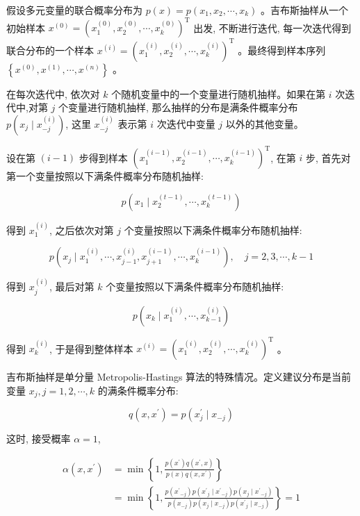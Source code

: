 \documentclass[10pt]{article}
\begin{document}
\begin{CJK*}{UTF8}{bsmi}
假设多元变量的联合概率分布为 $p(x)=p\left(x_{1}, x_{2}, \cdots, x_{k}\right)$ 。吉布斯抽样从一个初始样本 $x^{(0)}=\left(x_{1}^{(0)}, x_{2}^{(0)}, \cdots, x_{k}^{(0)}\right)^{\mathrm{T}}$ 出发, 不断进行迭代, 每一次迭代得到联合分布的一个样本 $x^{(i)}=\left(x_{1}^{(i)}, x_{2}^{(i)}, \cdots, x_{k}^{(i)}\right)^{\mathrm{T}}$ 。最终得到样本序列 $\left\{x^{(0)}, x^{(1)}, \cdots, x^{(n)}\right\}$ 。

在每次迭代中, 依次对 $k$ 个随机变量中的一个变量进行随机抽样。如果在第 $i$ 次迭代中,对第 $j$ 个变量进行随机抽样, 那么抽样的分布是满条件概率分布 $p\left(x_{j} \mid x_{-j}^{(i)}\right)$, 这里 $x_{-j}^{(i)}$ 表示第 $i$ 次迭代中变量 $j$ 以外的其他变量。

设在第 $(i-1)$ 步得到样本 $\left(x_{1}^{(i-1)}, x_{2}^{(i-1)}, \cdots, x_{k}^{(i-1)}\right)^{\mathrm{T}}$, 在第 $i$ 步, 首先对第一个变量按照以下满条件概率分布随机抽样:

$$
p\left(x_{1} \mid x_{2}^{(t-1)}, \cdots, x_{k}^{(t-1)}\right)
$$

得到 $x_{1}^{(i)}$, 之后依次对第 $j$ 个变量按照以下满条件概率分布随机抽样:

$$
p\left(x_{j} \mid x_{1}^{(i)}, \cdots, x_{j-1}^{(i)}, x_{j+1}^{(i-1)}, \cdots, x_{k}^{(i-1)}\right), \quad j=2,3, \cdots, k-1
$$

得到 $x_{j}^{(i)}$, 最后对第 $k$ 个变量按照以下满条件概率分布随机抽样:

$$
p\left(x_{k} \mid x_{1}^{(i)}, \cdots, x_{k-1}^{(i)}\right)
$$

得到 $x_{k}^{(i)}$, 于是得到整体样本 $x^{(i)}=\left(x_{1}^{(i)}, x_{2}^{(i)}, \cdots, x_{k}^{(i)}\right)^{\mathrm{T}}$ 。

吉布斯抽样是单分量 Metropolis-Hastings 算法的特殊情况。定义建议分布是当前变量 $x_{j}, j=1,2, \cdots, k$ 的满条件概率分布:


\begin{equation*}
q\left(x, x^{\prime}\right)=p\left(x_{j}^{\prime} \mid x_{-j}\right) \tag{19.49}
\end{equation*}


这时, 接受概率 $\alpha=1$,


\begin{align*}
\alpha\left(x, x^{\prime}\right) & =\min \left\{1, \frac{p\left(x^{\prime}\right) q\left(x^{\prime}, x\right)}{p(x) q\left(x, x^{\prime}\right)}\right\} \\
& =\min \left\{1, \frac{p\left(x^{\prime}{ }_{-j}\right) p\left(x^{\prime}{ }_{j} \mid x^{\prime}{ }_{-j}\right) p\left(x_{j} \mid x^{\prime}{ }_{-j}\right)}{p\left(x_{-j}\right) p\left(x_{j} \mid x_{-j}\right) p\left(x^{\prime}{ }_{j} \mid x_{-j}\right)}\right\}=1 \tag{19.50}
\end{align*}



\end{CJK*}
\end{document}
